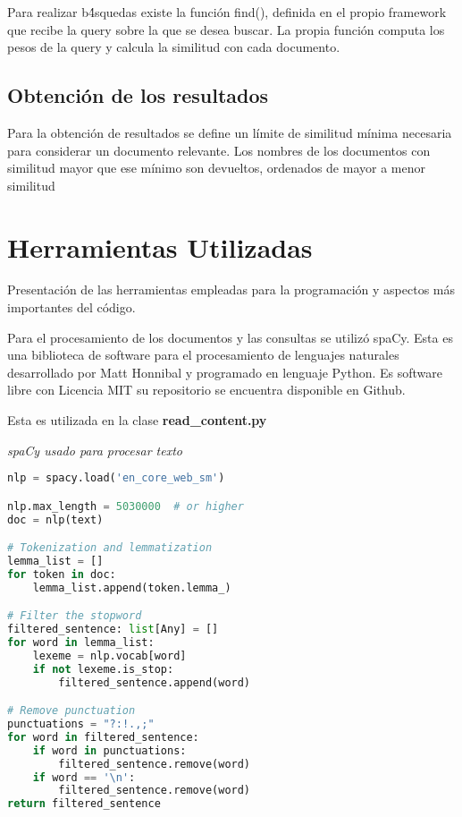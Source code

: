 \documentclass[runningheads,a4paper]{llncs}
\begin{document}
Para realizar b\'4squedas existe la funci\'on find(), definida en el propio framework que recibe la query sobre la que se desea buscar.
La propia funci\'on computa los pesos de la query y calcula la similitud con cada documento.

\subsection{Obtenci\'on de los resultados}\label{subsec:obtenci\'on-de-los-resultados}
Para la obtenci\'on de resultados se define un l\'imite de similitud m\'inima necesaria para considerar un documento relevante.
Los nombres de los documentos con similitud mayor que ese m\'inimo son devueltos, ordenados de mayor a menor similitud


\section{Herramientas Utilizadas}\label{sec:herramientas-utilizadas}
Presentaci\'on de las herramientas empleadas para la programaci\'on y aspectos m\'as importantes del c\'odigo.

Para el procesamiento de los documentos y las consultas se utiliz\'o spaCy. Esta es una biblioteca de software para el procesamiento de lenguajes naturales desarrollado por Matt Honnibal y programado en lenguaje Python.
Es software libre con Licencia MIT su repositorio se encuentra disponible en Github.

Esta es utilizada en la clase \textbf{read\_content.py}


\medskip
\noindent
{\it spaCy usado para procesar texto}

\begin{lstlisting}[language=Python,label={lst:lstlisting}]
nlp = spacy.load('en_core_web_sm')

nlp.max_length = 5030000  # or higher
doc = nlp(text)

# Tokenization and lemmatization
lemma_list = []
for token in doc:
	lemma_list.append(token.lemma_)

# Filter the stopword
filtered_sentence: list[Any] = []
for word in lemma_list:
	lexeme = nlp.vocab[word]
	if not lexeme.is_stop:
		filtered_sentence.append(word)

# Remove punctuation
punctuations = "?:!.,;"
for word in filtered_sentence:
	if word in punctuations:
		filtered_sentence.remove(word)
	if word == '\n':
		filtered_sentence.remove(word)
return filtered_sentence
\end{lstlisting}
\end{document}
